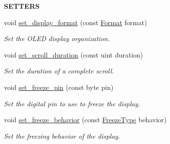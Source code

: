 \begin{Indent}{\bf S\+E\+T\+T\+E\+RS}\par
\begin{DoxyCompactItemize}
\item 
void \hyperlink{class_loom___o_l_e_d_a4ce08addf521b1bba3a1f73730d8650b}{set\+\_\+display\+\_\+format} (const \hyperlink{class_loom___o_l_e_d_aade282dab7eb118271f73b3b3bfc0ffd}{Format} format)
\begin{DoxyCompactList}\small\item\em Set the O\+L\+ED display organization. \end{DoxyCompactList}\item 
void \hyperlink{class_loom___o_l_e_d_a5e58b03b11b03f79f1d9c98b0247cef0}{set\+\_\+scroll\+\_\+duration} (const uint duration)
\begin{DoxyCompactList}\small\item\em Set the duration of a complete scroll. \end{DoxyCompactList}\item 
void \hyperlink{class_loom___o_l_e_d_a13dc4c96f830f9c949c3e6731b2f9318}{set\+\_\+freeze\+\_\+pin} (const byte pin)
\begin{DoxyCompactList}\small\item\em Set the digital pin to use to freeze the display. \end{DoxyCompactList}\item 
void \hyperlink{class_loom___o_l_e_d_a42eea08f2832c5afd31522b62601196b}{set\+\_\+freeze\+\_\+behavior} (const \hyperlink{class_loom___o_l_e_d_adedc20c1c901fe472d976c722abf0bb9}{Freeze\+Type} behavior)
\begin{DoxyCompactList}\small\item\em Set the freezing behavior of the display. \end{DoxyCompactList}\end{DoxyCompactItemize}
\end{Indent}
